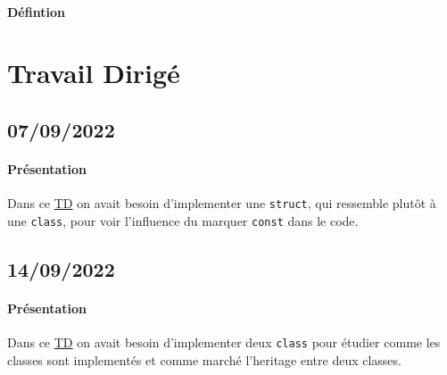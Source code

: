 \documentclass{article}
\begin{document}
\paragraph{Défintion}


\section{Travail Dirigé}
\subsection{07/09/2022}
\paragraph{Présentation}Dans ce \href{https://perso.ensta-paris.fr/~bmonsuez/Cours/doku.php?id=in204:seances:seance1}{TD} on avait besoin d'implementer une \texttt{struct}, qui ressemble plutôt à une \texttt{class}, pour voir l'influence du marquer \texttt{const} dans le code.
\begin{scriptsize}
    \mycode
    
\end{scriptsize}
\begin{scriptsize}
    \mycode
    
\end{scriptsize}

\newpage\subsection{14/09/2022}
\paragraph{Présentation}Dans ce \href{https://perso.ensta-paris.fr/~bmonsuez/Cours/doku.php?id=in204:seances:seance2}{TD} on avait besoin d'implementer deux \texttt{class} pour étudier comme les classes sont implementés et comme marché l'heritage entre deux classes.
\begin{scriptsize}
    \mycode
    
\end{scriptsize}
\begin{scriptsize}
    \mycode
    
\end{scriptsize}
\begin{scriptsize}
    \mycode
    
\end{scriptsize}
\end{document}
